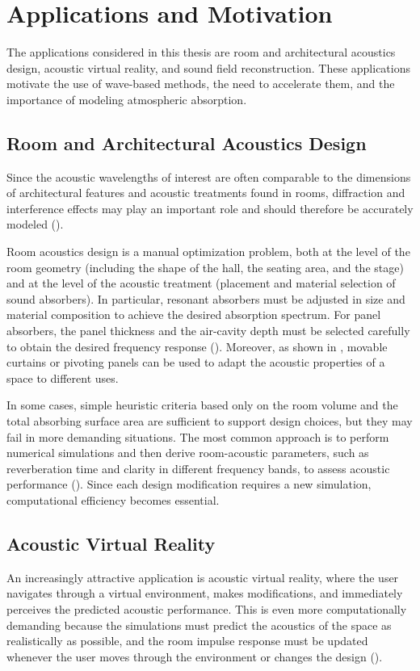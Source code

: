 \documentclass{Configuration_Files/PoliMi3i_thesis}
\begin{document}
\section{Applications and Motivation}
The applications considered in this thesis are room and architectural acoustics design, acoustic virtual reality, and sound field reconstruction. These applications motivate the use of wave-based methods, the need to accelerate them, and the importance of modeling atmospheric absorption.

\subsection{Room and Architectural Acoustics Design}
Since the acoustic wavelengths of interest are often comparable to the dimensions of architectural features and acoustic treatments found in rooms, diffraction and interference effects may play an important role and should therefore be accurately modeled (\cite{kuttruff_room_2009}).

Room acoustics design is a manual optimization problem, both at the level of the room geometry (including the shape of the hall, the seating area, and the stage) and at the level of the acoustic treatment (placement and material selection of sound absorbers). In particular, resonant absorbers must be adjusted in size and material composition to achieve the desired absorption spectrum. For panel absorbers, the panel thickness and the air-cavity depth must be selected carefully to obtain the desired frequency response (\cite{kuttruff_room_2009}). Moreover, as shown in \cite{cairoli_architectural_2018}, movable curtains or pivoting panels can be used to adapt the acoustic properties of a space to different uses.

In some cases, simple heuristic criteria based only on the room volume and the total absorbing surface area are sufficient to support design choices, but they may fail in more demanding situations. The most common approach is to perform numerical simulations and then derive room-acoustic parameters, such as reverberation time and clarity in different frequency bands, to assess acoustic performance (\cite{noauthor_acoustics_2009,kuttruff_room_2009}). Since each design modification requires a new simulation, computational efficiency becomes essential.

\subsection{Acoustic Virtual Reality}
An increasingly attractive application is acoustic virtual reality, where the user navigates through a virtual environment, makes modifications, and immediately perceives the predicted acoustic performance. This is even more computationally demanding because the simulations must predict the acoustics of the space as realistically as possible, and the room impulse response must be updated whenever the user moves through the environment or changes the design (\cite{savioja_creating_1999,pind_acoustic_2018}).
\end{document}
